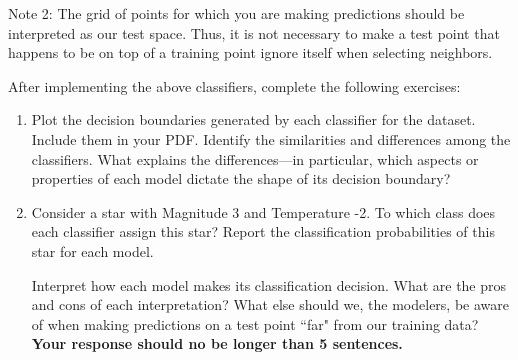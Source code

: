 \documentclass[submit]{harvardml}
\begin{document}
\begin{problem}
\begin{enumerate}[label=\alph*)]
  Note 2: The grid of points for which you are making predictions
  should be interpreted as our test space.  Thus, it is not necessary
  to make a test point that happens to be on top of a training point
  ignore itself when selecting neighbors.

\end{enumerate}

After implementing the above classifiers, complete the following exercises:

\begin{enumerate}
    \item Plot the decision boundaries generated by each classifier for the dataset. Include them in your PDF. 
    Identify the similarities and differences among the classifiers. What explains the differences---in particular, which aspects or properties of each model dictate the shape of its decision boundary? 
    
    \item 
    
    Consider a star with Magnitude 3 and Temperature -2. To which class does each classifier assign this star? Report the classification probabilities of this star for each model. 
    
    Interpret how each model makes its classification decision. What are the pros and cons of each interpretation? What else should we, the modelers, be aware of when making predictions on a test point ``far" from our training data? \textbf{Your response should no be longer than 5 sentences.}
\end{enumerate}
\end{problem}

\end{document}

